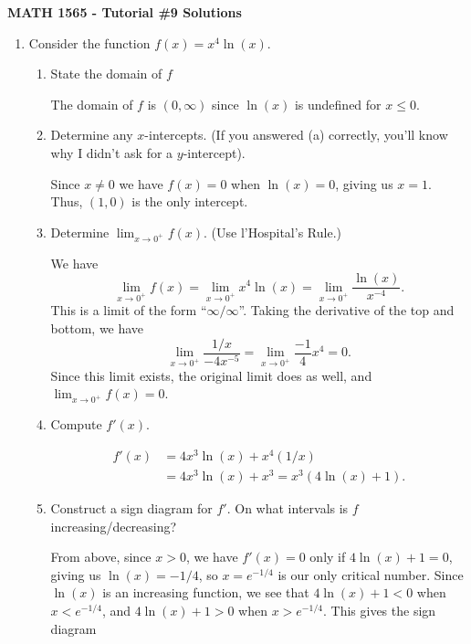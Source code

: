 \documentclass[12pt]{article}
\newcommand{\points}[1]{\marginpar{\hspace{24pt}[#1]}}
\newcommand{\di}{\displaystyle}
\begin{document}
\author{Instructor: Sean Fitzpatrick}
\thispagestyle{empty}
\begin{center}
{\bf MATH 1565 - Tutorial \#9 Solutions}\\
\end{center}

\begin{enumerate}
  \item Consider the function $f(x)=x^4\ln(x)$.
  \begin{enumerate}
  \item State the domain of $f$ \points{1}
  
\medskip

The domain of $f$ is $(0,\infty)$ since $\ln(x)$ is undefined for $x\leq 0$.
  
  \item Determine any $x$-intercepts. (If you answered (a) correctly, you'll know why I didn't ask for a $y$-intercept). \points{1}
  
\medskip

Since $x\neq 0$ we have $f(x)=0$ when $\ln(x)=0$, giving us $x=1$. Thus, $(1,0)$ is the only intercept.
  
  \item Determine $\di \lim_{x\to 0^+}f(x)$. (Use l'Hospital's Rule.) \points{3}
  
\medskip

We have 
\[
\lim_{x\to 0^+}f(x) = \lim_{x\to 0^+}x^4\ln(x) = \lim_{x\to 0^+}\frac{\ln(x)}{x^{-4}}.
\]
This is a limit of the form ``$\infty/\infty$''. Taking the derivative of the top and bottom, we have
\[
\lim_{x\to 0^+}\frac{1/x}{-4x^{-5}} = \lim_{x\to 0^+}\frac{-1}{4}x^4 = 0.
\]
Since this limit exists, the original limit does as well, and $\di\lim_{x\to 0^+}f(x) = 0$.
  
  \item Compute $f'(x)$. \points{2}
  
 \begin{align*}
 f'(x) & = 4x^3\ln(x) + x^4(1/x)\\
 & = 4x^3\ln(x)+x^3 = x^3(4\ln(x)+1).
 \end{align*}
  
  \item Construct a sign diagram for $f'$. On what intervals is $f$ increasing/decreasing? \points{2}
  
\medskip

From above, since $x>0$, we have $f'(x)=0$ only if $4\ln(x)+1=0$, giving us $\ln(x)=-1/4$, so $x=e^{-1/4}$ is our only critical number. Since $\ln(x)$ is an increasing function, we see that $4\ln(x)+1<0$ when $x<e^{-1/4}$, and $4\ln(x)+1>0$ when $x>e^{-1/4}$. This gives the sign diagram
 \begin{center}
\end{center}


\end{enumerate}
\end{enumerate}
\end{document}

